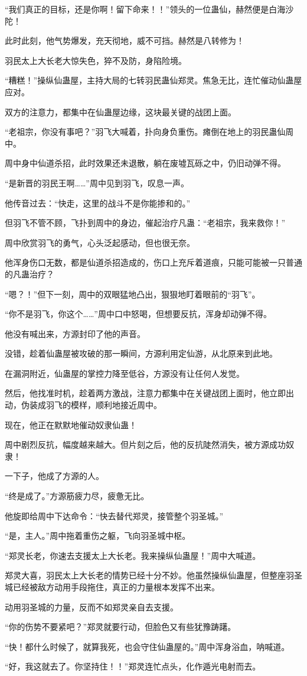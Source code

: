 \begin{this_body}
“我们真正的目标，还是你啊！留下命来！！”领头的一位蛊仙，赫然便是白海沙陀！

此时此刻，他气势爆发，充天彻地，威不可挡。赫然是八转修为！

羽民太上大长老大惊失色，猝不及防，身陷险境。

“糟糕！”操纵仙蛊屋，主持大局的七转羽民蛊仙郑灵。焦急无比，连忙催动仙蛊屋应对。

双方的注意力，都集中在仙蛊屋边缘，这块最关键的战团上面。

“老祖宗，你没有事吧？”羽飞大喊着，扑向身负重伤。瘫倒在地上的羽民蛊仙周中。

周中身中仙道杀招，此时效果还未退散，躺在废墟瓦砾之中，仍旧动弹不得。

“是新晋的羽民王啊……”周中见到羽飞，叹息一声。

他传音过去：“快走，这里的战斗不是你能掺和的。”

但羽飞不管不顾，飞扑到周中的身边，催起治疗凡蛊：“老祖宗，我来救你！”

周中欣赏羽飞的勇气，心头泛起感动，但也很无奈。

他浑身伤口无数，都是仙道杀招造成的，伤口上充斥着道痕，只能可能被一只普通的凡蛊治疗？

“嗯？！”但下一刻，周中的双眼猛地凸出，狠狠地盯着眼前的“羽飞”。

“你不是羽飞，你这个……”周中口中怒喝，但想要反抗，浑身却动弹不得。

他没有喊出来，方源封印了他的声音。

没错，趁着仙蛊屋被攻破的那一瞬间，方源利用定仙游，从北原来到此地。

在漏洞附近，仙蛊屋的掌控力降至低谷，方源没有让任何人发觉。

然后，他找准时机，趁着两方激战，注意力都集中在关键战团上面时，他立即出动，伪装成羽飞的模样，顺利地接近周中。

现在，他正在默默地催动奴隶仙蛊！

周中剧烈反抗，幅度越来越大。但片刻之后，他的反抗陡然消失，被方源成功奴隶！

一下子，他成了方源的人。

“终是成了。”方源筋疲力尽，疲惫无比。

他旋即给周中下达命令：“快去替代郑灵，接管整个羽圣城。”

“是，主人。”周中拖着重伤之躯，飞向羽圣城中枢。

“郑灵长老，你速去支援太上大长老。我来操纵仙蛊屋！”周中大喊道。

郑灵大喜，羽民太上大长老的情势已经十分不妙。他虽然操纵仙蛊屋，但整座羽圣城已经被敌方动用手段拖住，真正的力量根本发挥不出来。

动用羽圣城的力量，反而不如郑灵亲自去支援。

“你的伤势不要紧吧？”郑灵就要行动，但脸色又有些犹豫踌躇。

“快！都什么时候了，就算我死，也会守住仙蛊屋的。”周中浑身浴血，呐喊道。

“好，我这就去了。你坚持住！！”郑灵连忙点头，化作遁光电射而去。

\end{this_body}

